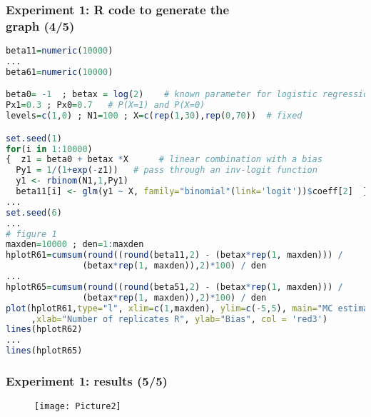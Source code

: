 \documentclass[border=5mm, convert, usenames, dvipsnames,beamer]{standalone}
\begin{document}
\begin{frame}[ fragile]{}

\frametitle{Experiment 1: R code to generate the \\ graph (4/5)}

\vspace{50}
\noindent


\par
\tiny
\begin{lstlisting}[language=R]
beta11=numeric(10000)
...
beta61=numeric(10000)

beta0= -1  ; betax = log(2)    # known parameter for logistic regression
Px1=0.3 ; Px0=0.7   # P(X=1) and P(X=0)
levels=c(1,0) ; N1=100 ; X=c(rep(1,30),rep(0,70))  # fixed

set.seed(1)
for(i in 1:10000)
{  z1 = beta0 + betax *X      # linear combination with a bias
  Py1 = 1/(1+exp(-z1))   # pass through an inv-logit function
  y1 <- rbinom(N1,1,Py1)
  beta11[i] <- glm(y1 ~ X, family="binomial"(link='logit'))$coeff[2]  }
...
set.seed(6)
...
# figure 1
maxden=10000 ; den=1:maxden
hplotR61=cumsum(round((round(beta11,2) - (betax*rep(1, maxden))) / 
               (betax*rep(1, maxden)),2)*100) / den
...
hplotR65=cumsum(round((round(beta51,2) - (betax*rep(1, maxden))) /
               (betax*rep(1, maxden)),2)*100) / den
plot(hplotR61,type="l", xlim=c(1,maxden), ylim=c(-5,5), main="MC estimates of bias ..."
     ,xlab="Number of replicates R", ylab="Bias", col = 'red3')
lines(hplotR62)
...
lines(hplotR65)
\end{lstlisting}

\par
\end{frame}



\begin{frame}[ fragile]{}

\frametitle{Experiment 1: results (5/5)}


\vspace{15mm}
\noindent
\begin{figure}[h!]
\begin{center}
\texttt{[image: Picture2]}
\caption{}
\end{center}
\end{figure}





\end{frame}
\end{document}
